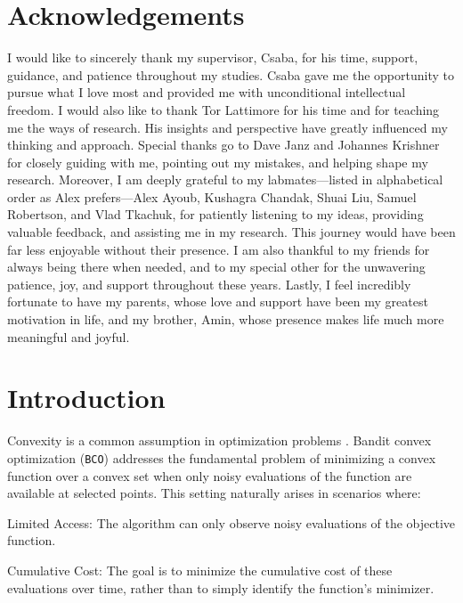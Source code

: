 \documentclass[letter, 12pt]{report}
\newcommand{\1}{\mathbf{1}}
\newcommand{\bco}{\texttt{BCO}\xspace}
\theoremstyle{plain}
\theoremstyle{definition}
\theoremstyle{remark}
\begin{document}
\chapter*{Acknowledgements} 
I would like to sincerely thank my supervisor, Csaba,
for his time, support, guidance, and patience throughout my studies.
Csaba gave me the opportunity to pursue what I love most and
provided me with unconditional intellectual freedom.
I would also like to thank Tor Lattimore for his time and for teaching me
the ways of research.
His insights and perspective have greatly influenced my thinking and approach.
Special thanks go to Dave Janz and Johannes Krishner for closely guiding with me,
pointing out my mistakes, and helping shape my research.
Moreover, I am deeply grateful to my labmates—listed
in alphabetical order as Alex prefers—Alex Ayoub, Kushagra Chandak,
Shuai Liu, Samuel Robertson, and Vlad Tkachuk, for patiently
listening to my ideas, providing valuable feedback,
and assisting me in my research.
This journey would have been far less enjoyable without
their presence.
I am also thankful to my friends for always being there when
needed, and to my special other for the unwavering patience,
joy, and support throughout these years.
Lastly, I feel incredibly fortunate to have my parents,
whose love and support have been my greatest motivation in
life, and my brother, Amin, whose presence makes
life much more meaningful and joyful.

\tableofcontents
\listoftables
\listoffigures
\listofalgorithms {}

\clearpage
\setcounter{page}{1}   %
\renewcommand{\thepage}{\arabic{page}} %
\chapter{Introduction} \label{ch:intro}
Convexity is a common assumption in optimization problems \citep{boyd2004convex}.
Bandit convex optimization (\bco) addresses the fundamental problem of minimizing a convex function over a convex set when only noisy evaluations of the function are available at selected points. This setting naturally arises in scenarios where:

\begin{enumroman}
    \item \textcolor{dkblue}{Limited Access:} The algorithm can only observe noisy evaluations of the objective function.
    \item \textcolor{dkblue}{Cumulative Cost:} The goal is to minimize the cumulative cost of these evaluations over time, rather than to simply identify the function’s minimizer.
\end{enumroman}
\end{document}
